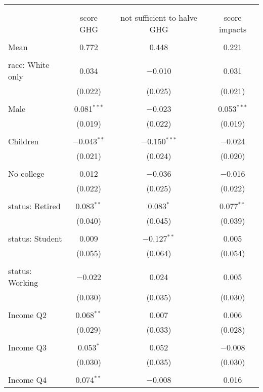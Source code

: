 
\begin{tabular}{@{\extracolsep{5pt}}lccc} 
\\[-1.8ex]\hline 
\hline \\[-1.8ex] 
\\[-1.8ex] & score GHG & not sufficient to halve GHG & score impacts \\ 
\hline \\[-1.8ex] 
 Mean & 0.772 & 0.448 & 0.221  \\ \hline \\[-1.8ex] race: White only & 0.034 & $-$0.010 & 0.031 \\ 
  & (0.022) & (0.025) & (0.021) \\ 
  & & & \\ 
 Male & 0.081$^{***}$ & $-$0.023 & 0.053$^{***}$ \\ 
  & (0.019) & (0.022) & (0.019) \\ 
  & & & \\ 
 Children & $-$0.043$^{**}$ & $-$0.150$^{***}$ & $-$0.024 \\ 
  & (0.021) & (0.024) & (0.020) \\ 
  & & & \\ 
 No college & 0.012 & $-$0.036 & $-$0.016 \\ 
  & (0.022) & (0.025) & (0.022) \\ 
  & & & \\ 
 status: Retired & 0.083$^{**}$ & 0.083$^{*}$ & 0.077$^{**}$ \\ 
  & (0.040) & (0.045) & (0.039) \\ 
  & & & \\ 
 status: Student & 0.009 & $-$0.127$^{**}$ & 0.005 \\ 
  & (0.055) & (0.064) & (0.054) \\ 
  & & & \\ 
 status: Working & $-$0.022 & 0.024 & 0.005 \\ 
  & (0.030) & (0.035) & (0.030) \\ 
  & & & \\ 
 Income Q2 & 0.068$^{**}$ & 0.007 & 0.006 \\ 
  & (0.029) & (0.033) & (0.028) \\ 
  & & & \\ 
 Income Q3 & 0.053$^{*}$ & 0.052 & $-$0.008 \\ 
  & (0.030) & (0.035) & (0.030) \\ 
  & & & \\ 
 Income Q4 & 0.074$^{**}$ & $-$0.008 & 0.016 \\ 

\end{tabular}
